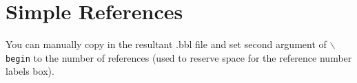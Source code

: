 \documentclass[lettersize,journal]{IEEEtran}
\begin{document}
%
%
%
\section{Simple References}
You can manually copy in the resultant .bbl file and set second argument of $\backslash${\tt{begin}} to the number of references
 (used to reserve space for the reference number labels box).
\end{document}
